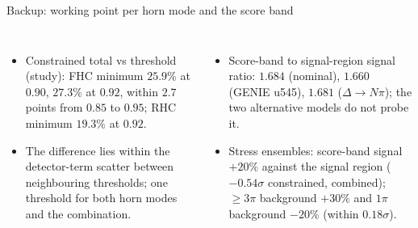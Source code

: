 \documentclass[aspectratio=169,10pt]{beamer}
\begin{document}
\begin{frame}{Backup: working point per horn mode and the score band}
  \begin{columns}[T]
  \begin{itemize}\footnotesize\setlength\itemsep{3pt}
    \item Constrained total vs threshold (study): FHC minimum $25.9\%$ at $0.90$, $27.3\%$ at $0.92$,
          within $2.7$ points from $0.85$ to $0.95$; RHC minimum $19.3\%$ at $0.92$.
    \item The difference lies within the detector-term scatter between neighbouring thresholds; one
          threshold for both horn modes and the combination.
  \end{itemize}
  \begin{itemize}\footnotesize\setlength\itemsep{3pt}
    \item Score-band to signal-region signal ratio: $1.684$ (nominal), $1.660$ (GENIE u545), $1.681$
          ($\Delta\to N\pi$); the two alternative models do not probe it.
    \item Stress ensembles: score-band signal $+20\%$ against the signal region ($-0.54\sigma$ constrained, combined);
          $\geq3\pi$ background $+30\%$ and $1\pi$ background $-20\%$ (within $0.18\sigma$).
  \end{itemize}
  \end{columns}
\end{frame}
\end{document}
